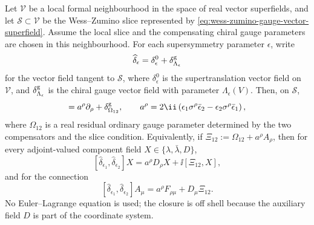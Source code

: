 \begin{proposition}
\label{prop:wess-zumino-gauge-closure}
Let \(\mathcal V\) be a local formal neighbourhood in the space of real
vector superfields, and let \(\mathcal S\subset\mathcal V\) be the
Wess--Zumino slice represented by
\eqref{eq:wess-zumino-gauge-vector-superfield}.  Assume the local slice and
the compensating chiral gauge parameters are chosen in this
neighbourhood.  For each supersymmetry parameter \(\epsilon\), write
\[
  \widehat\delta_\epsilon
  =
  \delta^0_\epsilon+\delta^{\rm g}_{\Lambda_\epsilon}
\]
for the vector field tangent to \(\mathcal S\), where
\(\delta^0_\epsilon\) is the supertranslation vector field on
\(\mathcal V\), and \(\delta^{\rm g}_{\Lambda_\epsilon}\) is the chiral
gauge vector field with parameter \(\Lambda_\epsilon(V)\).  Then, on
\(\mathcal S\),
\begin{equation}
  [\widehat\delta_{\epsilon_1},\widehat\delta_{\epsilon_2}]
  =
  a^\rho\partial_\rho+\delta^{\rm g}_{\Omega_{12}},
  \qquad
  a^\rho=
  2\ii\left(
  \epsilon_1\sigma^\rho\bar\epsilon_2
  -\epsilon_2\sigma^\rho\bar\epsilon_1
  \right),
  \label{eq:wess-zumino-gauge-closure}
\end{equation}
where \(\Omega_{12}\) is a real residual ordinary gauge parameter determined
by the two compensators and the slice condition.  Equivalently, if
\(\Xi_{12}:=\Omega_{12}+a^\rho A_\rho\), then for every adjoint-valued
component field \(X\in\{\lambda,\bar\lambda,D\}\),
\[
  [\widehat\delta_{\epsilon_1},\widehat\delta_{\epsilon_2}]X
  =
  a^\rho D_\rho X+\ii[\Xi_{12},X],
\]
and for the connection
\[
  [\widehat\delta_{\epsilon_1},\widehat\delta_{\epsilon_2}]A_\mu
  =
  a^\rho F_{\rho\mu}+D_\mu\Xi_{12}.
\]
No Euler--Lagrange equation is used; the closure is off shell because the
auxiliary field \(D\) is part of the coordinate system.
\end{proposition}

